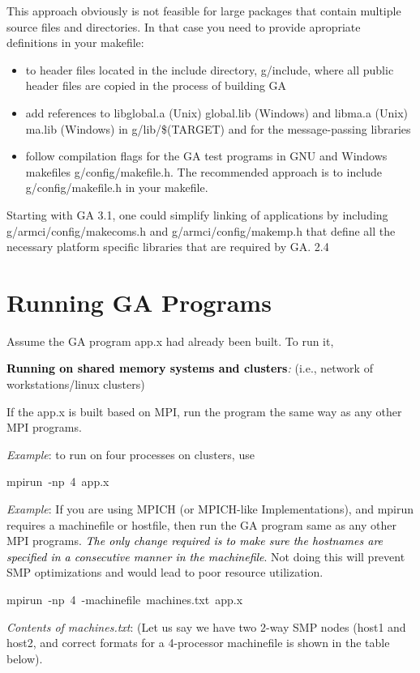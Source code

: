This approach obviously is not feasible for large packages that contain
multiple source files and directories. In that case you need to provide
apropriate definitions in your makefile:
\begin{itemize}
\item to header files located in the include directory, g/include, where
all public header files are copied in the process of building GA 
\item add references to libglobal.a (Unix) global.lib (Windows) and libma.a
(Unix) ma.lib (Windows) in g/lib/\$(TARGET) and for the message-passing
libraries 
\item follow compilation flags for the GA test programs in GNU and Windows
makefiles g/config/makefile.h. The recommended approach is to include
g/config/makefile.h in your makefile.
\end{itemize}
Starting with GA 3.1, one could simplify linking of applications by
including g/armci/config/makecoms.h and g/armci/config/makemp.h that
define all the necessary platform specific libraries that are required
by GA. 2.4 


\section{Running GA Programs }

Assume the GA program app.x had already been built. To run it,

\textbf{\textcolor{black}{Running on shared memory systems and clusters}}\emph{:
}(i.e., network of workstations/linux clusters)

If the app.x is built based on MPI, run the program the same way as
any other MPI programs. 

\emph{Example}: to run on four processes on clusters, use 
\begin{lyxcode}
mpirun~-np~4~app.x
\end{lyxcode}
\emph{Example}: If you are using MPICH (or MPICH-like Implementations),
and mpirun requires a machinefile or hostfile, then run the GA program
same as any other MPI programs. \textit{\textcolor{black}{The only
change required is to make sure the hostnames are specified in a consecutive
manner in the machinefile}}. Not doing this will prevent SMP optimizations
and would lead to poor resource utilization.
\begin{lyxcode}
mpirun~-np~4~-machinefile~machines.txt~app.x
\end{lyxcode}
\emph{Contents of machines.txt}: (Let us say we have two 2-way SMP
nodes (host1 and host2, and correct formats for a 4-processor machinefile
is shown in the table below).


